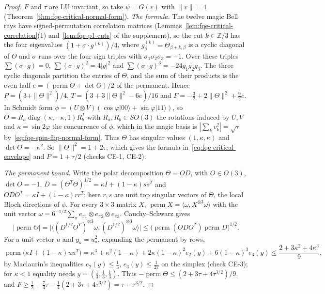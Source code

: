 \begin{proof}
$F$ and $\tau$ are LU invariant, so take $\psi=G(v)$ with $\|v\|=1$ (Theorem~\ref{thm:fqe-critical-normal-form}).
\emph{The formula.} The twelve magic Bell rays have signed-permutation correlation matrices
(Lemmas~\ref{lem:fqe-critical-correlation}(1) and~\ref{lem:fqe-p1-cuts} of the supplement), so the cut $k\in\mathbb Z/3$ has the four eigenvalues
$(1+\sigma\cdot g^{(k)})/4$, where $g^{(k)}_\beta=\Theta_{\beta+k,\beta}$ is a cyclic diagonal of $\Theta$ and $\sigma$ runs over
the four sign triples with $\sigma_1\sigma_2\sigma_3=-1$. Over these triples $\sum(\sigma\cdot g)=0$,
$\sum(\sigma\cdot g)^2=4|g|^2$ and $\sum(\sigma\cdot g)^3=-24g_1g_2g_3$. The three cyclic diagonals partition the
entries of $\Theta$, and the sum of their products is the even half $e=(\operatorname{perm}\Theta+\det\Theta)/2$ of the
permanent. Hence $P=(3+\|\Theta\|^2)/4$, $T=(3+3\|\Theta\|^2-6e)/16$ and
$F=-\tfrac32+2\|\Theta\|^2+\tfrac92e$. In Schmidt form $\phi=(U\otimes V)(\cos\varphi|00\rangle+\sin\varphi|11\rangle)$,
so $\Theta=R_a\operatorname{diag}(\kappa,-\kappa,1)R_b^T$ with $R_a,R_b\in SO(3)$ the rotations induced by $U,V$ and
$\kappa=\sin2\varphi$ the concurrence of $\phi$, which in the magic basis is $|\sum_kv_k^2|=\sqrt\tau$
by~\eqref{eq:fqe-spin-flip-normal-form}. Thus $\Theta$ has singular values $(1,\kappa,\kappa)$ and $\det\Theta=-\kappa^2$. So $\|\Theta\|^2=1+2\tau$, which gives the formula in~\eqref{eq:fqe-critical-envelope}
and $P=1+\tau/2$ (checks CE-1, CE-2).

\emph{The permanent bound.} Write the polar decomposition $\Theta=OD$, with $O\in O(3)$, $\det O=-1$,
$D=(\Theta^T\Theta)^{1/2}=\kappa I+(1-\kappa)ss^T$ and $ODO^T=\kappa I+(1-\kappa)rr^T$; here $r,s$ are unit top singular
vectors of $\Theta$, the local Bloch directions of $\phi$. For every $3\times3$ matrix $X$,
$\operatorname{perm}X=\langle\omega,X^{\otimes3}\omega\rangle$ with the unit vector
$\omega=6^{-1/2}\sum_\pi e_{\pi1}\otimes e_{\pi2}\otimes e_{\pi3}$. Cauchy--Schwarz gives
\[
 |\operatorname{perm}\Theta|
 =\bigl|\bigl\langle(D^{1/2}O^T)^{\otimes3}\omega,(D^{1/2})^{\otimes3}\omega\bigr\rangle\bigr|
 \le\bigl(\operatorname{perm}(ODO^T)\operatorname{perm}D\bigr)^{1/2}.
\]
For a unit vector $u$ and $y_a=u_a^2$, expanding the permanent by rows,
\[
 \operatorname{perm}\bigl(\kappa I+(1-\kappa)uu^T\bigr)
 =\kappa^3+\kappa^2(1-\kappa)+2\kappa(1-\kappa)^2e_2(y)+6(1-\kappa)^3e_3(y)
 \le\frac{2+3\kappa^2+4\kappa^3}9,
\]
by Maclaurin's inequalities $e_2(y)\le\frac13$, $e_3(y)\le\frac1{27}$ on the simplex (check CE-3); for $\kappa<1$ equality needs
$y=(\frac13,\frac13,\frac13)$. Thus $-\operatorname{perm}\Theta\le(2+3\tau+4\tau^{3/2})/9$, and
$F\ge\frac12+\frac74\tau-\frac14(2+3\tau+4\tau^{3/2})=\tau-\tau^{3/2}$.


\end{proof}
